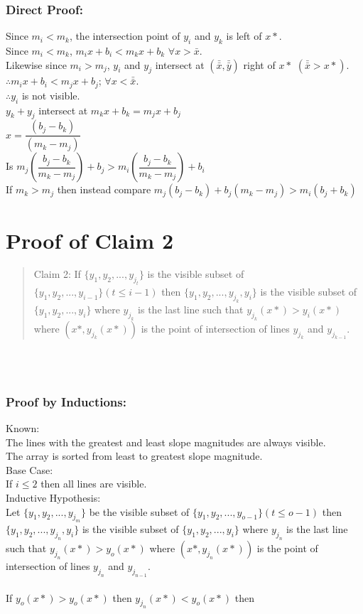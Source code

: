\documentclass{article}
\begin{document}
    \subsubsection*{Direct Proof:}
    Since $m_i < m_k$, the intersection point of $y_i$ and $y_k$ is left of $x*$.\\
    Since $m_i < m_k$, $m_i x + b_i < m_k x + b_k$ $\forall{x > \bar{x}}$.\\
    Likewise since $m_i > m_j$, $y_i$ and $y_j$ intersect at $(\bar{\bar{x}}, \bar{\bar{y}})$ right of $x*$ $(\bar{\bar{x}} > x*)$.\\
    $\therefore m_i x + b_i < m_j x + b_j$; $\forall{x < \bar{\bar{x}}}$.\\
    $\therefore y_i$ is not visible.\\
    $y_k + y_j$ intersect at $m_k x + b_k = m_j x + b_j$\\
    $x = \dfrac{(b_j - b_k)}{(m_k - m_j)}$\\
    Is $m_j \left( \dfrac{b_j - b_k}{m_k - m_j}\right) + b_j > m_i \left(\dfrac{b_j - b_k}{m_k - m_j}\right) + b_i$\\
    If $m_k > m_j$ then instead compare $m_j (b_j - b_k) + b_j (m_k - m_j) > m_i (b_j + b_k)$

\section*{Proof of Claim 2}
\begin{quote}
    Claim 2: If $\{y_1, y_2,...,y_{j_{t}}\}$ is the visible subset of $\{y_1, y_2,...,y_{i - 1}\} (t \leq i - 1)$ then $\{y_1, y_2,...,y_{j_{k}}, y_i\}$ is the visible subset of $\{y_1, y_2,...,y_{i}\}$ where $y_{j_{k}}$ is the last line such that $y_{j_{k}} (x*) > y_i (x*)$ where $(x*, y_{j_{k}}(x*))$ is the point of intersection of lines $y_{j_{k}}$ and $y_{j_{k - 1}}$.
\end{quote}\\
\\
\subsubsection*{Proof by Inductions:}
Known:\\
The lines with the greatest and least slope magnitudes are always visible.\\
The array is sorted from least to greatest slope magnitude.\\
Base Case:\\
If $i \leq 2$ then all lines are visible.\\
Inductive Hypothesis:\\
Let $\{y_1, y_2,...,y_{j_{m}}\}$ be the visible subset of $\{y_1, y_2,...,y_{o - 1}\} (t \leq o - 1)$ then $\{y_1, y_2,...,y_{j_{n}}, y_i\}$ is the visible subset of $\{y_1, y_2,...,y_{i}\}$ where $y_{j_{n}}$ is the last line such that $y_{j_{n}} (x*) > y_o (x*)$ where $(x*, y_{j_{n}}(x*))$ is the point of intersection of lines $y_{j_{n}}$ and $y_{j_{n - 1}}$.\\
\\
If $y_o (x*) > y_o (x*)$ then 
$y_{j_n}(x*) < y_o (x*)$ then 
\end{document}
